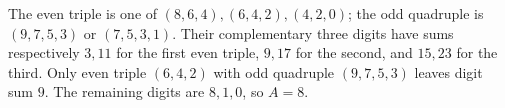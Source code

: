 The even triple is one of $(8,6,4),(6,4,2),(4,2,0)$; the odd quadruple is $(9,7,5,3)$ or $(7,5,3,1)$. Their complementary three digits have sums respectively $3,11$ for the first even triple, $9,17$ for the second, and $15,23$ for the third. Only even triple $(6,4,2)$ with odd quadruple $(9,7,5,3)$ leaves digit sum $9$. The remaining digits are $8,1,0$, so $\boxed{A=8}$.
